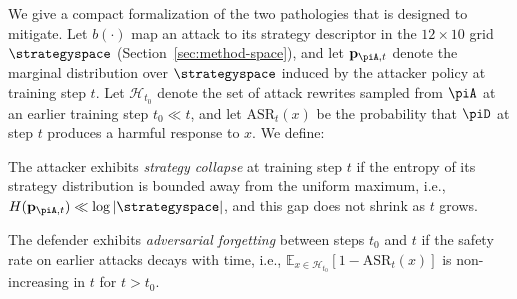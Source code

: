 We give a compact formalization of the two pathologies that \method is designed to mitigate. Let $b(\cdot)$ map an attack to its strategy descriptor in the $12\times10$ grid $\strategyspace$ (Section~\ref{sec:method-space}), and let $\mathbf{p}_{\piA,t}$ denote the marginal distribution over $\strategyspace$ induced by the attacker policy at training step $t$. Let $\mathcal{H}_{t_0}$ denote the set of attack rewrites sampled from $\piA$ at an earlier training step $t_0\!\ll\!t$, and let $\mathrm{ASR}_t(x)$ be the probability that $\piD$ at step $t$ produces a harmful response to $x$. We define:
\begin{definition}
\label{def:collapse}
The attacker exhibits \emph{strategy collapse} at training step $t$ if the entropy of its strategy distribution is bounded away from the uniform maximum, i.e., $H(\mathbf{p}_{\piA,t})\ll \log|\strategyspace|$, and this gap does not shrink as $t$ grows.
\end{definition}
\begin{definition}
\label{def:forgetting}
The defender exhibits \emph{adversarial forgetting} between steps $t_0$ and $t$ if the safety rate on earlier attacks decays with time, i.e., $\mathbb{E}_{x\in\mathcal{H}_{t_0}}[1-\mathrm{ASR}_t(x)]$ is non-increasing in $t$ for $t>t_0$.
\end{definition}
